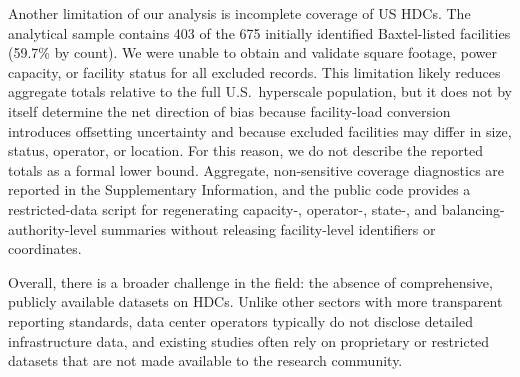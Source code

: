 \documentclass[12pt]{article}
\begin{document}
Another limitation of our analysis is incomplete coverage of US HDCs. The analytical sample contains 403 of the 675 initially identified Baxtel-listed facilities (59.7\% by count). We were unable to obtain and validate square footage, power capacity, or facility status for all excluded records. This limitation likely reduces aggregate totals relative to the full U.S.\ hyperscale population, but it does not by itself determine the net direction of bias because facility-load conversion introduces offsetting uncertainty and because excluded facilities may differ in size, status, operator, or location. For this reason, we do not describe the reported totals as a formal lower bound. Aggregate, non-sensitive coverage diagnostics are reported in the Supplementary Information, and the public code provides a restricted-data script for regenerating capacity-, operator-, state-, and balancing-authority-level summaries without releasing facility-level identifiers or coordinates.





Overall, there is a broader challenge in the field: the absence of comprehensive, publicly available datasets on HDCs. Unlike other sectors with more transparent reporting standards, data center operators typically do not disclose detailed infrastructure data, and existing studies often rely on proprietary or restricted datasets that are not made available to the research community. 
\end{document}
